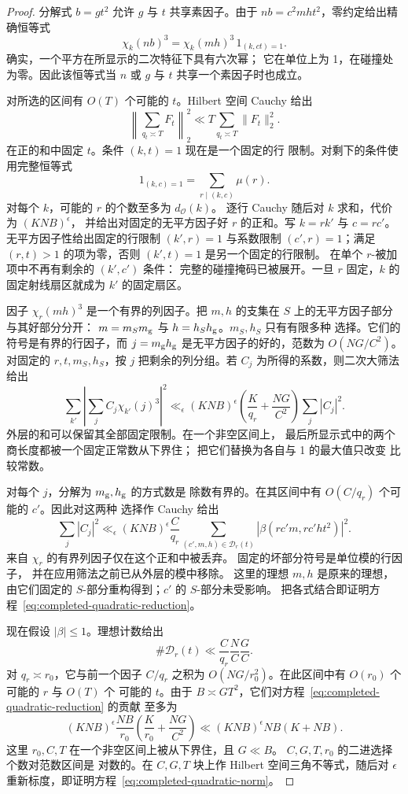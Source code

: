\begin{proof}
分解式 $b=gt^2$ 允许 $g$ 与 $t$ 共享素因子。由于
$nb=c^2mht^2$，零约定给出精确恒等式
\begin{equation}\label{eq:completed-quadratic-zero-mask}
 \chi_k(nb)^3=\chi_k(mh)^3\,1_{(k,ct)=1}.
\end{equation}
确实，一个平方在所显示的二次特征下具有六次幂；
它在单位上为 1，在碰撞处为零。因此该恒等式当
$n$ 或 $g$ 与 $t$ 共享一个素因子时也成立。

对所选的区间有 $O(T)$ 个可能的 $t$。Hilbert 空间 Cauchy
给出
\[
 \left\|\sum_{q_t\asymp T}F_t\right\|_2^2
 \ll T\sum_{q_t\asymp T}\|F_t\|_2^2.
\]
在正的和中固定 $t$。条件 $(k,t)=1$ 现在是一个固定的行
限制。对剩下的条件使用完整恒等式
\[
 1_{(k,c)=1}=\sum_{r\mid(k,c)}\mu(r).
\]
对每个 $k$，可能的 $r$ 的个数至多为 $d_{\mathcal O}(k)$。
逐行 Cauchy 随后对 $k$ 求和，代价为 $(KNB)^\epsilon$，
并给出对固定的无平方因子好 $r$ 的正和。写
$k=rk'$ 与 $c=rc'$。无平方因子性给出固定的行限制
$(k',r)=1$ 与系数限制 $(c',r)=1$；满足
$(r,t)>1$ 的项为零，否则 $(k',t)=1$ 是另一个固定的行限制。
在单个 $r$-被加项中不再有剩余的 $(k',c')$ 条件：
完整的碰撞掩码已被展开。一旦 $r$ 固定，$k$
的固定射线扇区就成为 $k'$ 的固定扇区。

因子 $\chi_r(mh)^3$ 是一个有界的列因子。把 $m,h$
的支集在 $S$ 上的无平方因子部分与其好部分分开：
$m=m_Sm_{\rm g}$ 与 $h=h_Sh_{\rm g}$。$m_S,h_S$ 只有有限多种
选择。它们的符号是有界的行因子，而
$j=m_{\rm g}h_{\rm g}$ 是无平方因子的好的，范数为 $O(NG/C^2)$。
对固定的 $r,t,m_S,h_S$，按 $j$ 把剩余的列分组。若 $C_j$
为所得的系数，则二次大筛法给出
\[
 \sum_{k'}\left|\sum_j C_j\chi_{k'}(j)^3\right|^2
 \ll_\epsilon (KNB)^\epsilon
       \left(\frac K{q_r}+\frac{NG}{C^2}\right)\sum_j|C_j|^2.
\]
外层的和可以保留其全部固定限制。在一个非空区间上，
最后所显示式中的两个商长度都被一个固定正常数从下界住；
把它们替换为各自与 1 的最大值只改变
比较常数。

对每个 $j$，分解为 $m_{\rm g},h_{\rm g}$ 的方式数是
除数有界的。在其区间中有 $O(C/q_r)$ 个可能的 $c'$。因此对这两种
选择作 Cauchy 给出
\[
 \sum_j|C_j|^2
 \ll_\epsilon (KNB)^\epsilon\frac C{q_r}
 \sum_{(c',m,h)\in\mathcal D_r(t)}
          |\beta(rc'm,rc'ht^2)|^2.
\]
来自 $\chi_r$ 的有界列因子仅在这个正和中被丢弃。
固定的坏部分符号是单位模的行因子，
并在应用筛法之前已从外层的模中移除。
这里的理想 $m,h$ 是原来的理想，
由它们固定的 $S$-部分重构得到；$c'$ 的 $S$-部分未受影响。
把各式结合即证明方程~\eqref{eq:completed-quadratic-reduction}。

现在假设 $|\beta|\le1$。理想计数给出
\[
 \#\mathcal D_r(t)\ll
       \frac C{q_r}\frac NC\frac GC.
\]
对 $q_r\asymp r_0$，它与前一个因子 $C/q_r$ 之积为
$O(NG/r_0^2)$。在此区间中有 $O(r_0)$ 个可能的 $r$ 与 $O(T)$ 个
可能的 $t$。由于 $B\asymp GT^2$，它们对方程~\eqref{eq:completed-quadratic-reduction} 的贡献
至多为
\[
 (KNB)^\epsilon\frac{NB}{r_0}
       \left(\frac K{r_0}+\frac{NG}{C^2}\right)
 \ll (KNB)^\epsilon NB(K+NB).
\]
这里 $r_0,C,T$ 在一个非空区间上被从下界住，且 $G\ll B$。
$C,G,T,r_0$ 的二进选择个数对范数区间是
对数的。在 $C,G,T$ 块上作 Hilbert 空间三角不等式，随后对
$\epsilon$ 重新标度，即证明方程~\eqref{eq:completed-quadratic-norm}。
\end{proof}

